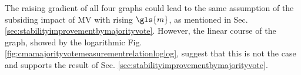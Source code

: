 The raising gradient of all four graphs could lead to the same assumption of the subsiding impact of \ac{MV} with rising $\gls{m}$, as mentioned in Sec. \ref{sec:stabilityimprovementbymajorityvote}.
However, the linear course of the graph, showed by the logarithmic Fig. \ref{fig:cmamajorityvotemeasurementrelationloglog}, suggest that this is not the case and supports the result of Sec. \ref{sec:stabilityimprovementbymajorityvote}.


